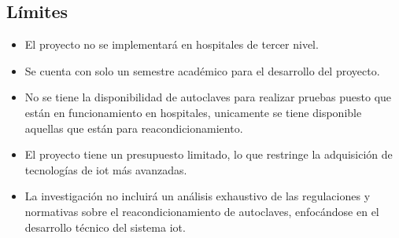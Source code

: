\subsection*{Límites}

\begin{itemize}
    \item El proyecto no se implementará en hospitales de tercer nivel.
    \item Se cuenta con solo un semestre académico para el desarrollo del proyecto.
    \item No se tiene la disponibilidad de autoclaves para realizar pruebas puesto que están en funcionamiento en hospitales, unicamente se tiene disponible aquellas que están para reacondicionamiento.
    \item El proyecto tiene un presupuesto limitado, lo que restringe la adquisición de tecnologías de \acrshort{iot} más avanzadas.
    \item La investigación no incluirá un análisis exhaustivo de las regulaciones y normativas sobre el reacondicionamiento de autoclaves, enfocándose en el desarrollo técnico del sistema \acrshort{iot}.
\end{itemize}
